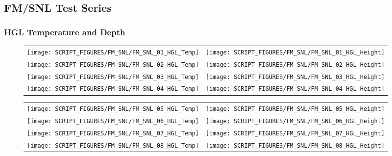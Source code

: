 \clearpage

\subsection{FM/SNL Test Series}

\subsubsection{HGL Temperature and Depth}

\begin{figure}[!ht]
\begin{tabular*}{\textwidth}{l@{\extracolsep{\fill}}r}
\texttt{[image: SCRIPT\_FIGURES/FM\_SNL/FM\_SNL\_01\_HGL\_Temp]} &
\texttt{[image: SCRIPT\_FIGURES/FM\_SNL/FM\_SNL\_01\_HGL\_Height]} \\
\texttt{[image: SCRIPT\_FIGURES/FM\_SNL/FM\_SNL\_02\_HGL\_Temp]} &
\texttt{[image: SCRIPT\_FIGURES/FM\_SNL/FM\_SNL\_02\_HGL\_Height]} \\
\texttt{[image: SCRIPT\_FIGURES/FM\_SNL/FM\_SNL\_03\_HGL\_Temp]} &
\texttt{[image: SCRIPT\_FIGURES/FM\_SNL/FM\_SNL\_03\_HGL\_Height]} \\
\texttt{[image: SCRIPT\_FIGURES/FM\_SNL/FM\_SNL\_04\_HGL\_Temp]} &
\texttt{[image: SCRIPT\_FIGURES/FM\_SNL/FM\_SNL\_04\_HGL\_Height]}
\end{tabular*}
\end{figure}

\begin{figure}[!ht]
\begin{tabular*}{\textwidth}{l@{\extracolsep{\fill}}r}
\texttt{[image: SCRIPT\_FIGURES/FM\_SNL/FM\_SNL\_05\_HGL\_Temp]} &
\texttt{[image: SCRIPT\_FIGURES/FM\_SNL/FM\_SNL\_05\_HGL\_Height]} \\\texttt{[image: SCRIPT\_FIGURES/FM\_SNL/FM\_SNL\_06\_HGL\_Temp]} &
\texttt{[image: SCRIPT\_FIGURES/FM\_SNL/FM\_SNL\_06\_HGL\_Height]} \\
\texttt{[image: SCRIPT\_FIGURES/FM\_SNL/FM\_SNL\_07\_HGL\_Temp]} &
\texttt{[image: SCRIPT\_FIGURES/FM\_SNL/FM\_SNL\_07\_HGL\_Height]} \\
\texttt{[image: SCRIPT\_FIGURES/FM\_SNL/FM\_SNL\_08\_HGL\_Temp]} &
\texttt{[image: SCRIPT\_FIGURES/FM\_SNL/FM\_SNL\_08\_HGL\_Height]}
\end{tabular*}
\end{figure}


